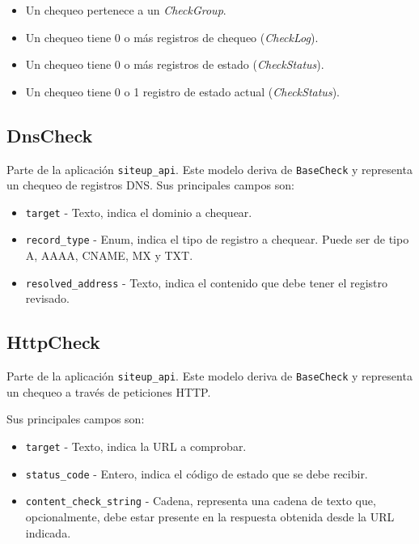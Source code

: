 \begin{itemize}
\item Un chequeo pertenece a un \textit{CheckGroup}.
\item Un chequeo tiene 0 o más registros de chequeo (\textit{CheckLog}).
\item Un chequeo tiene 0 o más registros de estado (\textit{CheckStatus}).
\item Un chequeo tiene 0 o 1 registro de estado actual (\textit{CheckStatus}).
\end{itemize}

\subsection{DnsCheck}

Parte de la aplicación \texttt{siteup\_api}. Este modelo deriva de
\texttt{BaseCheck} y representa un chequeo de registros DNS. Sus principales campos son:

\begin{itemize}
\item \texttt{target} - Texto, indica el dominio a chequear.
\item \texttt{record\_type} - Enum, indica el tipo de registro a chequear. Puede ser de tipo A, AAAA, CNAME, MX y TXT.
\item \texttt{resolved\_address} - Texto, indica el contenido que debe tener el registro revisado.
\end{itemize}

\subsection{HttpCheck}

Parte de la aplicación \texttt{siteup\_api}. Este modelo deriva de
\texttt{BaseCheck} y representa un chequeo a través de peticiones HTTP.

Sus principales campos son:

\begin{itemize}
\item \texttt{target} - Texto, indica la URL a comprobar.
\item \texttt{status\_code} - Entero, indica el código de estado que se debe recibir.
\item \texttt{content\_check\_string} - Cadena, representa una cadena de texto
  que, opcionalmente, debe estar presente en la respuesta obtenida desde la URL indicada.
\end{itemize}

